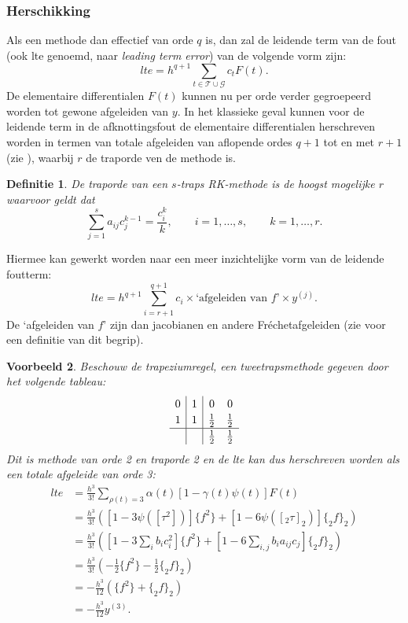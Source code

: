 \documentclass[12pt]{article}
\newtheorem{defn}{Definitie}
\newtheorem{vbn}[defn]{Voorbeeld}
\begin{document}
\subsubsection{Herschikking}
Als een methode dan effectief van orde \(q\) is, dan zal de leidende term van de fout (ook lte genoemd, naar \textit{leading term error}) van de volgende vorm zijn:
\[lte=h^{q+1}\sum_{t\in\mathcal{T}\cup\mathcal{G}}c_tF(t).\]
De elementaire differentialen \(F(t)\) kunnen nu per orde verder gegroepeerd worden tot gewone afgeleiden van \(y\). In het klassieke geval kunnen voor de leidende term in de afknottingsfout de elementaire differentialen herschreven worden in termen van totale afgeleiden van aflopende ordes \(q+1\) tot en met \(r+1\) (zie \cite{stageorder}), waarbij \(r\) de traporde ven de methode is.
\begin{defn} \label{def:stageorder}
    De traporde van een \(s\)-traps RK-methode is de hoogst mogelijke \(r\) waarvoor geldt dat
    \[\sum^s_{j=1}a_{ij}c_j^{k-1}=\frac{c_i^k}{k},\qquad i=1,\dots,s,\qquad k=1,\dots,r.\]
\end{defn}
Hiermee kan gewerkt worden naar een meer inzichtelijke vorm van de leidende foutterm:
\[lte=h^{q+1}\sum^{q+1}_{i=r+1}c_i\times\text{`afgeleiden van \(f\)'}\times y^{(j)}.\]
De `afgeleiden van \(f\)' zijn dan jacobianen en andere Fréchetafgeleiden (zie \cite{gnm} voor een definitie van dit begrip).
\begin{vbn}
    Beschouw de trapeziumregel, een tweetrapsmethode gegeven door het volgende tableau:
    \[
    \renewcommand\arraystretch{1.2}
    \begin{array}
    {c|c|cc}
    0 & 1 & 0 & 0 \\
    1 & 1 & \frac{1}{2} & \frac{1}{2} \\
    \hline
    && \frac{1}{2} & \frac{1}{2}
    \end{array}
    \]
    Dit is methode van orde 2 en traporde 2 en de lte kan dus herschreven worden als een totale afgeleide van orde 3:
    \begin{align*}
        lte&=\frac{h^3}{3!}\sum_{\rho(t)=3}\alpha(t)[1-\gamma(t)\psi(t)]F(t) \\
        &=\frac{h^3}{3!}\left([1-3\psi([\tau^2])]\{f^2\}+[1-6\psi([_2\tau]_2)]\{_2f\}_2\right) \\
        &=\frac{h^3}{3!}\left([1-3\sum_ib_ic^2_i]\{f^2\}+[1-6\sum_{i,j}b_ia_{ij}c_j]\{_2f\}_2\right) \\
        &=\frac{h^3}{3!}\left(-\frac{1}{2}\{f^2\}-\frac{1}{2}\{_2f\}_2\right) \\
        &=-\frac{h^3}{12}(\{f^2\}+\{_2f\}_2) \\
        &=-\frac{h^3}{12}y^{(3)}.
    \end{align*}
\end{vbn}
\end{document}
